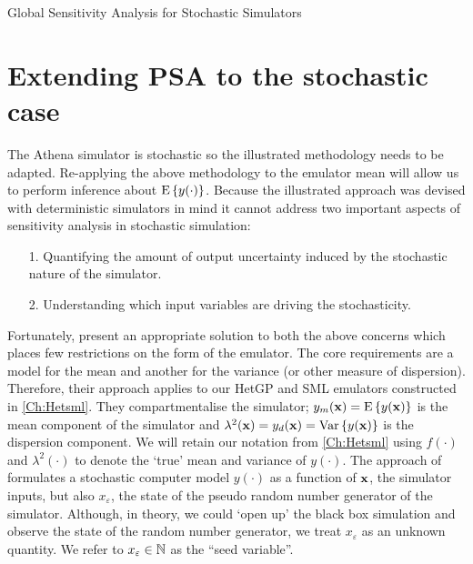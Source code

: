 \begin{chapter}{Global Sensitivity Analysis for Stochastic Simulators\label{Ch:sensitivity}}
\section{Extending PSA to the stochastic case}
The Athena simulator is stochastic so the illustrated methodology needs to be adapted. Re-applying the above methodology to the emulator mean will allow us to perform inference about $\textrm{E}\,\{ y(\cdot) \}$. Because the illustrated approach was devised with deterministic simulators in mind it cannot address two important aspects of sensitivity analysis in stochastic simulation:
\begin{itemize}
	\item[1.] Quantifying the amount of output uncertainty induced by the stochastic nature of the simulator.
	\item[2.] Understanding which input variables are driving the stochasticity.
\end{itemize}
Fortunately, \citet{Marrel2012} present an appropriate solution to both the above concerns which places few restrictions on the form of the emulator.  The core requirements are a model for the mean and another for the variance (or other measure of dispersion). Therefore, their approach applies to our HetGP and SML emulators constructed in \cref{Ch:Hetsml}. They compartmentalise the simulator; $y_m(\mathbf{x}) = \textrm{E}\, \{ y(\mathbf{x}) \} $ is the mean component of the simulator and $\lambda^2(\mathbf{x}) = y_d(\mathbf{x}) = \mathrm{Var}\, \{ y(\mathbf{x}) \} $ is the dispersion component. We will retain our notation from \cref{Ch:Hetsml} using $f(\cdot)$ and $\lambda^2(\cdot)$  to denote the `true' mean and variance of $y(\cdot)$. The approach of \citet{Marrel2012} formulates a stochastic computer model $y(\cdot)$ as a function of $\mathbf{x}$, the simulator inputs, but also $x_\varepsilon$, the state of the pseudo random number generator of the simulator. Although, in theory, we could `open up' the black box simulation and observe the state of the random number generator, we treat $x_\varepsilon$ as an unknown quantity. We refer to $x_\varepsilon \in \mathbb{N}$ as the ``seed variable''.

\end{chapter}

